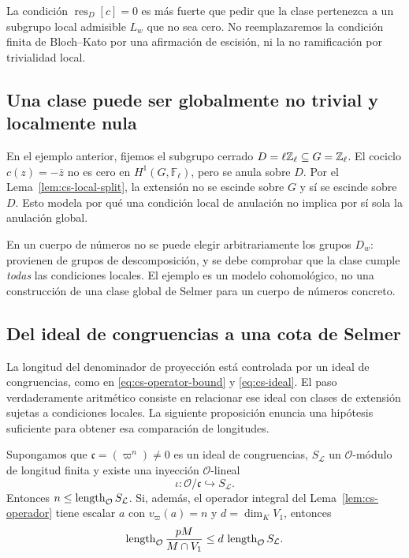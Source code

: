 La condición $\operatorname{res}_D[c]=0$ es más fuerte
que pedir que la clase pertenezca a un subgrupo local
admisible $L_w$ que no sea cero. No reemplazaremos la
condición finita de Bloch--Kato por una afirmación de escisión,
ni la no ramificación por trivialidad local.

\subsection{Una clase puede ser globalmente no trivial y localmente nula}

En el ejemplo anterior, fijemos el subgrupo cerrado
$D=\ell\mathbb{Z}_\ell\subseteq G=\mathbb{Z}_\ell$. El cociclo
$c(z)=-\bar z$ no es cero en $H^1(G,\mathbb F_\ell)$, pero
se anula sobre $D$. Por el Lema~\ref{lem:cs-local-split},
la extensión no se escinde sobre $G$ y sí se escinde sobre
$D$. Esto modela por qué una condición local de anulación
no implica por sí sola la anulación global.

En un cuerpo de números no se puede elegir arbitrariamente
los grupos $D_w$: provienen de grupos de descomposición,
y se debe comprobar que la clase cumple \emph{todas} las
condiciones locales. El ejemplo es un modelo cohomológico,
no una construcción de una clase global de Selmer para un
cuerpo de números concreto.

\subsection{Del ideal de congruencias a una cota de Selmer}

La longitud del denominador de proyección está controlada
por un ideal de congruencias, como en
\eqref{eq:cs-operator-bound} y \eqref{eq:cs-ideal}.
El paso verdaderamente aritmético consiste en relacionar
ese ideal con clases de extensión sujetas a condiciones
locales. La siguiente proposición enuncia una hipótesis
suficiente para obtener esa comparación de longitudes.

\begin{proposicion}
\label{prop:cs-puente}
Supongamos que $\mathfrak c=(\varpi^n)\ne0$ es un
ideal de congruencias, $S_\mathcal L$ un $\mathcal O$-módulo
de longitud finita y existe una inyección $\mathcal O$-lineal
\begin{equation}
 \iota:\mathcal O/\mathfrak c\hookrightarrow S_\mathcal L.
 \label{eq:cs-inyeccion}
\end{equation}
Entonces $n\le\operatorname{length}_{\mathcal O}S_\mathcal L$.
Si, además, el operador integral del
Lema~\ref{lem:cs-operador} tiene escalar $a$ con
$v_\varpi(a)=n$ y $d=\dim_KV_1$, entonces
\begin{equation}
 \operatorname{length}_{\mathcal O}\frac{pM}{M\cap V_1}
 \le d\,\operatorname{length}_{\mathcal O} S_\mathcal L.
 \label{eq:cs-selmer-bound}
\end{equation}
\end{proposicion}

